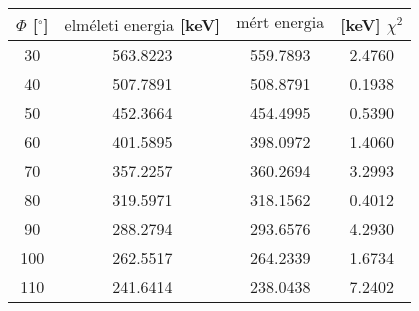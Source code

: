 \documentclass{article}
\begin{document}
\begin{tabular}{|c| c| c| c|}\hline
$\Phi$ [$^{\circ}$] & $\text{elméleti energia}$ [keV] & $\text{mért energia}$ & [keV] $\chi^2$ \\ \hline
30 &563.8223 &559.7893&2.4760 \\ \hline
40 &507.7891 &508.8791&0.1938 \\ \hline
50 &452.3664 &454.4995&0.5390\\ \hline
60&401.5895 &398.0972&1.4060\\ \hline
70&357.2257 &360.2694&3.2993\\ \hline
80& 319.5971&318.1562&0.4012\\ \hline
90& 288.2794&293.6576&4.2930\\ \hline
100&262.5517 &264.2339&1.6734\\ \hline
110&241.6414 &238.0438&7.2402\\ \hline
\end{tabular}
\end{document}
